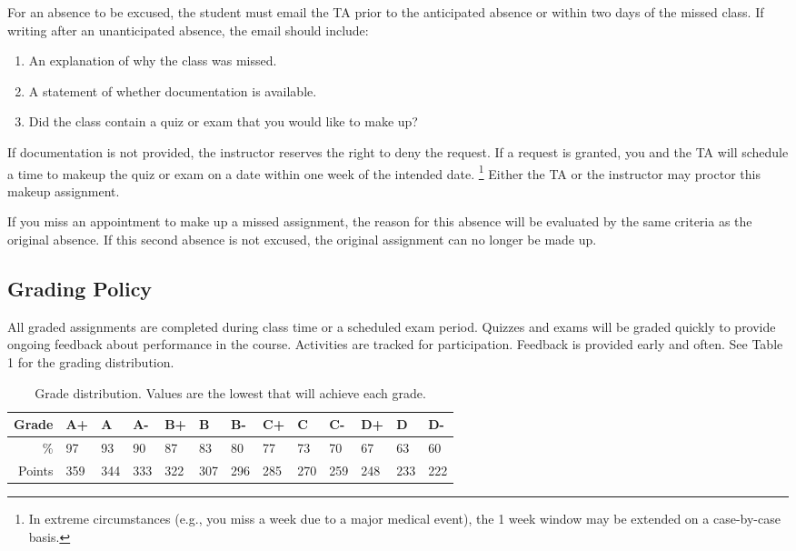\documentclass[11pt]{article}
\begin{document}

For an absence to be excused, the student must email the TA prior to the  anticipated absence or within two days of the missed class.
If writing after an unanticipated absence, the email should include:

\begin{enumerate}
	\item An explanation of why the class was missed.
	\item A statement of whether documentation is available.
	\item Did the class contain a quiz or exam that you would like to make up?
\end{enumerate}

If documentation is not provided, the instructor reserves the right to deny the request.
If a request is granted, you and the TA will schedule a time to makeup the quiz or exam on a date within one week of the intended date.%
\footnote{In extreme circumstances (e.g., you miss a week due to a major medical event), the 1 week window may be extended on a case-by-case basis.}
Either the TA or the instructor may proctor this makeup assignment.


If you miss an appointment to make up a missed assignment, the reason for this absence will be evaluated by the same criteria as the original absence.
If this second absence is not excused, the original assignment can no longer be made up.

\subsection*{Grading Policy}
All graded assignments are completed during class time or a scheduled exam period.
Quizzes and exams will be graded quickly to provide ongoing feedback about performance in the course.
Activities are tracked for participation.
Feedback is provided early and often.
See Table 1 for the grading distribution.

\begin{table}[t]
	\centering
	\begin{tabular}{rllllllllllll}
		\toprule
		Grade & A+ & A & A- & B+ & B & B- & C+ & C & C- & D+ & D & D- \\  
		\midrule
		\% & 97 & 93 & 90 & 87 & 83 & 80 & 77 & 73 & 70 & 67 & 63 & 60 \\ 
		Points & 359 & 344 & 333 & 322 & 307 & 296 & 285 & 270 & 259 & 248 & 233 & 222 \\ 
		\bottomrule
	\end{tabular}
	\caption{Grade distribution. Values are the lowest that will achieve each grade.}
\end{table}
\end{document}
